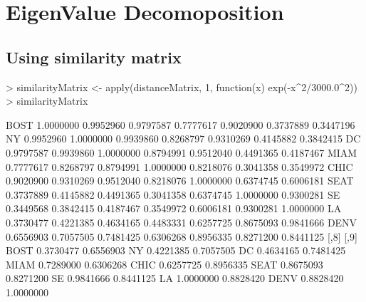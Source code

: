 \documentclass{article}
\begin{document}
\section{EigenValue Decomoposition}
\subsection{Using similarity matrix}

\begin{Schunk}
\begin{Sinput}
> similarityMatrix <- apply(distanceMatrix, 1, function(x) exp(-x^2/3000.0^2))
> similarityMatrix
\end{Sinput}
\begin{Soutput}
          [,1]      [,2]      [,3]      [,4]      [,5]      [,6]      [,7]
BOST 1.0000000 0.9952960 0.9797587 0.7777617 0.9020900 0.3737889 0.3447196
NY   0.9952960 1.0000000 0.9939860 0.8268797 0.9310269 0.4145882 0.3842415
DC   0.9797587 0.9939860 1.0000000 0.8794991 0.9512040 0.4491365 0.4187467
MIAM 0.7777617 0.8268797 0.8794991 1.0000000 0.8218076 0.3041358 0.3549972
CHIC 0.9020900 0.9310269 0.9512040 0.8218076 1.0000000 0.6374745 0.6006181
SEAT 0.3737889 0.4145882 0.4491365 0.3041358 0.6374745 1.0000000 0.9300281
SE   0.3449568 0.3842415 0.4187467 0.3549972 0.6006181 0.9300281 1.0000000
LA   0.3730477 0.4221385 0.4634165 0.4483331 0.6257725 0.8675093 0.9841666
DENV 0.6556903 0.7057505 0.7481425 0.6306268 0.8956335 0.8271200 0.8441125
          [,8]      [,9]
BOST 0.3730477 0.6556903
NY   0.4221385 0.7057505
DC   0.4634165 0.7481425
MIAM 0.7289000 0.6306268
CHIC 0.6257725 0.8956335
SEAT 0.8675093 0.8271200
SE   0.9841666 0.8441125
LA   1.0000000 0.8828420
DENV 0.8828420 1.0000000
\end{Soutput}
\end{Schunk}
\end{document}
